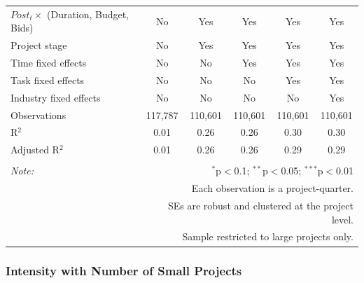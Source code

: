 \documentclass[
]{article}
\begin{document}
\begin{table}[H]
\begin{tabular}{@{\extracolsep{-10pt}}lccccc}
$Post_t \times $  (Duration, Budget, Bids) & No & Yes & Yes & Yes & Yes \\ 
Project stage & No & Yes & Yes & Yes & Yes \\ 
Time fixed effects & No & No & Yes & Yes & Yes \\ 
Task fixed effects & No & No & No & Yes & Yes \\ 
Industry fixed effects & No & No & No & No & Yes \\ 
Observations & 117,787 & 110,601 & 110,601 & 110,601 & 110,601 \\ 
R$^{2}$ & 0.01 & 0.26 & 0.26 & 0.30 & 0.30 \\ 
Adjusted R$^{2}$ & 0.01 & 0.26 & 0.26 & 0.29 & 0.29 \\ 
\hline 
\hline \\[-1.8ex] 
\textit{Note:}  & \multicolumn{5}{r}{$^{*}$p$<$0.1; $^{**}$p$<$0.05; $^{***}$p$<$0.01} \\ 
 & \multicolumn{5}{r}{Each observation is a project-quarter.} \\ 
 & \multicolumn{5}{r}{SEs are robust and clustered at the project level.} \\ 
 & \multicolumn{5}{r}{Sample restricted to large projects only.} \\ 
\end{tabular} 
\end{table}

\hypertarget{intensity-with-number-of-small-projects}{%
\subsubsection{Intensity with Number of Small
Projects}\label{intensity-with-number-of-small-projects}}
\end{document}
